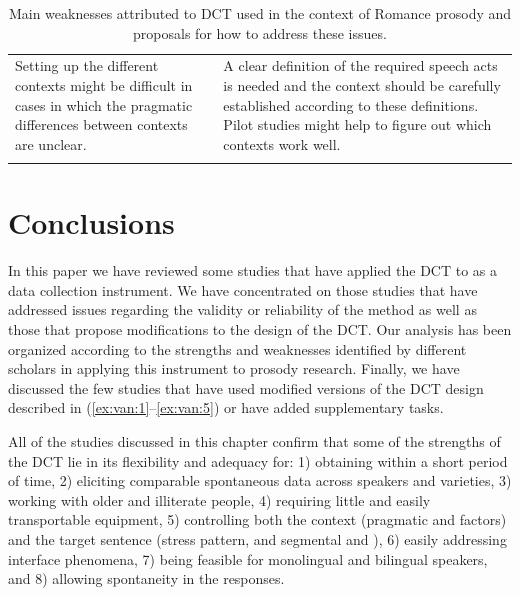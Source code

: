 \documentclass[output=paper]{LSP/langsci}
\begin{document}
\begin{table}
\begin{tabularx}{\textwidth}{@{}p{4.5cm}X@{}}
\tablevspace
Setting up the different contexts might be difficult in cases in which the pragmatic differences between contexts are unclear. & A clear definition of the required speech acts is needed and the context should be carefully established according to these definitions. Pilot studies might help to figure out which contexts work well.\\
\lspbottomrule
\end{tabularx}
\caption{\label{tab:van:3} Main weaknesses attributed to DCT used in the context of Romance prosody and proposals for how to address these issues.}
\end{table}

\section{Conclusions}

In this paper we have reviewed some studies that have applied the DCT to   as a data collection instrument. We have concentrated on those studies that have addressed issues regarding the validity or reliability of the method as well as those that propose modifications to the design of the DCT. Our analysis has been organized according to the strengths and weaknesses identified by different scholars in applying this instrument to  prosody research. Finally, we have discussed the few studies that have used modified versions of the DCT design described in (\ref{ex:van:1}--\ref{ex:van:5}) or have added supplementary tasks.

All of the studies discussed in this chapter confirm that some of the strengths of the DCT lie in its flexibility and adequacy for: 1) obtaining  within a short period of time, 2) eliciting comparable spontaneous data across speakers and varieties, 3) working with older and illiterate people, 4) requiring little and easily transportable equipment, 5) controlling both the context (pragmatic and  factors) and the target sentence (stress pattern,  and segmental and ), 6) easily addressing interface phenomena, 7) being feasible for monolingual and bilingual speakers, and 
8) allowing spontaneity in the responses. 
\end{document}
